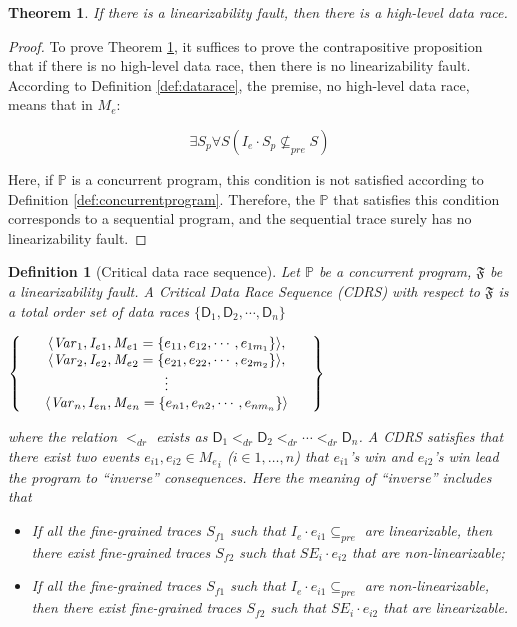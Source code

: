 \documentclass[runningheads]{llncs}
\newcommand{\sset}[1]{\left\{{#1}\right\}}
\newcommand{\se}{\mathit{I_e}}
\newcommand{\ce}{\mathit{M_e}}
\newcommand{\dr}{\mathsf{D}}
\newtheorem{myTheo}{Theorem}
\newtheorem{myDef}{Definition}
\begin{document}
\begin{myTheo}\label{theo:datarace}
   If there is a linearizability fault, then there is a high-level data race.
\end{myTheo}

\begin{proof}
To prove Theorem \ref{theo:datarace}, it suffices to prove the contrapositive proposition that if there is no high-level data race, 
then there is no linearizability fault. According to Definition \ref{def:datarace}, the premise, no high-level data race, means that in $\ce$:

$$\exists S_p \forall S ( \se\cdot S_p \nsubseteq_{pre} S)$$

Here, if $\mathbb{P}$ is a concurrent program, this condition is not satisfied according to Definition \ref{def:concurrentprogram}. 
Therefore, the $\mathbb{P}$ that satisfies this condition corresponds to a sequential program, and the sequential trace surely has no linearizability fault.
\end{proof}


\begin{myDef}[Critical data race sequence]\label{def:cdrs}
    Let  $\mathbb{P}$ be a concurrent program, $\mathfrak{F}$ be a linearizability fault. A \textit{Critical Data Race Sequence} (\textit{CDRS}) with respect to
 $\mathfrak{F}$ is a total order set of data races $\{\mathsf{D}_1,\mathsf{D}_2,\cdots,\mathsf{D}_n\}$


$\Set{\begin{array}{ccc}
   & \langle\mathit{Var}_1, \se_1, \ce_1 = \sset{e_{11},e_{12},\cdots,e_{1m_1}}\rangle, & \\
   & \langle\mathit{Var}_2, \se_2, \ce_2 = \sset{e_{21},e_{22},\cdots,e_{2m_2}}\rangle, &\\
   & \vdots& \\
   &\langle \mathit{Var}_n, \se_n, \ce_n = \sset{e_{n1},e_{n2},\cdots,e_{nm_n}} \rangle&
   \end{array}}$


\noindent where the relation $<_{dr}$ exists as $\mathsf{D}_1 <_{dr} \dr_2 <_{dr} \cdots  <_{dr} \mathsf{D}_n$.
A CDRS satisfies that there exist two events $e_{i1}, e_{i2}\in \ce_i$ ($i\in{1,\dots,n}$)   that $e_{i1}$'s win and
$e_{i2}$'s win lead the program to ``inverse'' consequences. Here the meaning of ``inverse'' includes that
\begin{itemize}
\item If all the fine-grained traces $S_{f1}$ such that $\se\cdot e_{i1} \subseteq_{pre}$ are linearizable, then there exist fine-grained traces $S_{f2}$ such that 
$\mathit{SE_i}\cdot e_{i2}$ that are non-linearizable;
\item If all the fine-grained traces $S_{f1}$ such that $\se\cdot e_{i1} \subseteq_{pre}$ are non-linearizable, then there exist fine-grained traces $S_{f2}$ such that 
$\mathit{SE_i}\cdot e_{i2}$ that are linearizable.\\
\end{itemize}
\end{myDef}
\end{document}
